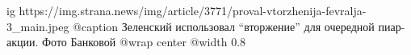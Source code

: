  
 
 
 
 

\ifcmt
  ig https://img.strana.news/img/article/3771/proval-vtorzhenija-fevralja-3_main.jpeg
  @caption Зеленский использовал \enquote{вторжение} для очередной пиар-акции. Фото Банковой
  @wrap center
  @width 0.8
\fi
